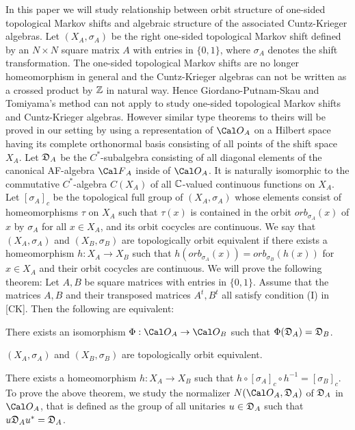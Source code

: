 In this paper we will study relationship between 
 orbit structure of one-sided topological Markov shifts and 
 algebraic structure of the associated Cuntz-Krieger algebras.
Let 
$(X_A,\sigma_A)$ 
be the right one-sided topological Markov shift
defined by an $N\times N$ square matrix $A$ with entries in $\{0,1\}$,
where $\sigma_A$ denotes the shift transformation.
 The one-sided topological Markov shifts 
 are no longer homeomorphism in general 
and the Cuntz-Krieger algebras 
 can not be written as a crossed product by $\Bbb Z$  in natural way.
 Hence Giordano-Putnam-Skau and Tomiyama's method 
 can not apply to study one-sided topological Markov shifts and Cuntz-Krieger algebras.  
However similar  type theorems to theirs 
will be proved  in our setting
by using a representation of $\OA$ on a Hilbert space having its complete orthonormal basis consisting of all points of the shift space $X_A$.
Let ${{\frak D}_A}$ be the $C^*$-subalgebra consisting of all diagonal elements 
of the canonical AF-algebra $\FA$ inside of $\OA$. 
It is naturally isomorphic to the commutative $C^*$-algebra 
$C(X_A)$ of all ${\Bbb C}$-valued continuous functions on $X_A$.
Let $[\sigma_A]_c$ be the topological full group of 
$(X_A,\sigma_A)$ 
whose elements consist of homeomorphisms $\tau$ on $X_A$ 
such that $\tau (x) $ 
is contained in the orbit $orb_{\sigma_A}(x)$ of $x$
by $\sigma_A$ for all $x \in X_A$, 
and its orbit cocycles are continuous. 
We say that $(X_A, \sigma_A)$ and $(X_B, \sigma_B)$ 
are topologically orbit equivalent if there exists a homeomorphism $h:X_A \longrightarrow X_B$ 
such that
$h(orb_{\sigma_A}(x)) = orb_{\sigma_B}(h(x))$ for $x \in X_A$
and their orbit cocycles are continuous.
We will prove the following theorem:
Let $A, B$ be square matrices with entries in $\{0,1\}$.
Assume that the matrices $A, B$ and their transposed matrices $A^t, B^t$ 
 all satisfy condition (I) in [CK]. 
Then the  following are equivalent:
 \roster
 \item There exists an isomorphism $\Phi: \OA \rightarrow  \OB$
 such that $\Phi({{\frak D}_A}) = {{\frak D}_B}$.
\item
$(X_A, \sigma_A)$ and $(X_B, \sigma_B)$ are topologically orbit equivalent.
\item There exists a homeomorphism $h: X_A \rightarrow X_B$ such that
$h \circ [\sigma_A ]_c \circ h^{-1} = [\sigma_B ]_c$. 
\endroster
\endproclaim
To prove the above theorem, 
we study the normalizer $N(\OA,\DA)$ of ${{\frak D}_A}$ in $\OA$,
that is defined as  the group of all unitaries 
$u \in {{\frak D}_A}$ such that $u{{\frak D}_A} u^* ={{\frak D}_A}$. 
